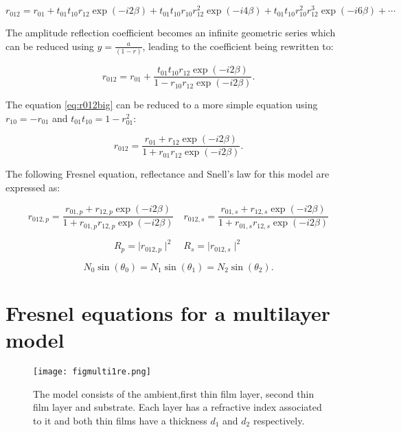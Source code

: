 \documentclass[MasterThesisMain.tex]{subfiles}
\begin{document}
\begin{equation}
r_{012} = r_{01} + t_{01}t_{10}r_{12}\exp(-i2\beta) + t_{01}t_{10}r_{10}r_{12}^2\exp(-i4\beta)+ t_{01}t_{10}r_{10}^2r_{12}^3\exp(-i6\beta)+ \cdots
\end{equation}  

The amplitude reflection coefficient becomes an infinite geometric series which can be reduced using $y=\frac{a}{(1-r)}$, leading to the coefficient being rewritten to:

\begin{equation} \label{eq:r012big}
r_{012}=r_{01}+\frac{t_{01}t_{10}r_{12}\exp(-i2\beta)}{1-r_{10}r_{12}\exp(-i2\beta)}.
\end{equation}

The equation \ref{eq:r012big} can be reduced to a more simple equation using $r_{10}=-r_{01}$ and $t_{01}t_{10}=1-r_{01}^2$:

\begin{equation}\label{eq:2layerreflect}
r_{012}= \frac{r_{01}+r_{12}\exp(-i2\beta)}{1+r_{01}r_{12}\exp(-i2\beta)}.
\end{equation} 

The following Fresnel equation, reflectance and Snell's law for this model are expressed as:

\begin{equation}
r_{012,p} = \frac{r_{01,p}+r_{12,p}\exp(-i2\beta)}{1+r_{01,p}r_{12,p}\exp(-i2\beta)} \quad r_{012,s}= \frac{r_{01,s}+r_{12,s}\exp(-i2\beta)}{1+r_{01,s}r_{12,s}\exp(-i2\beta)}
\end{equation}

\begin{equation}
R_p=\mid r_{012,p} \mid^2 \quad R_s=\mid r_{012,s} \mid^2
\end{equation}

\begin{equation}
N_0\sin(\theta_0)=N_1\sin(\theta_1)=N_2\sin(\theta_2).
\end{equation} 

\section{Fresnel equations for a multilayer model}\label{ch:fresnelmulti} 

\begin{figure}
\centering
\texttt{[image: figmulti1re.png]}
\caption{The model consists of the ambient,first thin film layer, second thin film layer and substrate. Each layer has a refractive index associated to it and both thin films have a thickness $d_1$ and $d_2$ respectively.}
\label{fig:multilayer1}
\end{figure}
\end{document}
